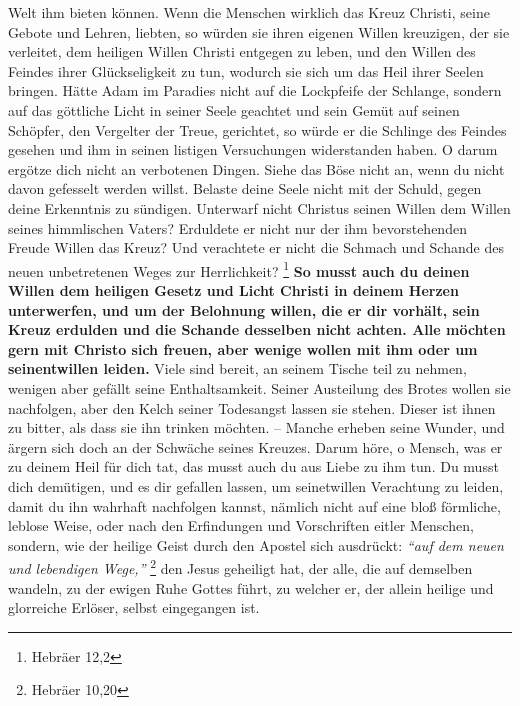 Welt ihm bieten können. Wenn die Menschen wirklich das Kreuz Christi, seine
Gebote und Lehren, liebten, so würden sie ihren eigenen Willen kreuzigen, der
sie verleitet, dem heiligen Willen Christi entgegen zu leben, und den Willen des
Feindes ihrer Glückseligkeit zu tun, wodurch sie sich um das Heil ihrer Seelen
bringen. Hätte Adam im Paradies nicht auf die Lockpfeife der Schlange, sondern
auf das göttliche Licht in seiner Seele geachtet und sein Gemüt auf seinen
Schöpfer, den Vergelter der Treue, gerichtet, so würde er die Schlinge des
Feindes gesehen und ihm in seinen listigen Versuchungen widerstanden haben. O
darum ergötze dich nicht an verbotenen Dingen. Siehe das Böse nicht an, wenn du
nicht davon gefesselt werden willst. Belaste deine Seele nicht mit der Schuld,
gegen deine Erkenntnis zu sündigen. Unterwarf nicht Christus seinen Willen dem
Willen seines himmlischen Vaters? Erduldete er nicht nur der ihm bevorstehenden
Freude Willen das Kreuz? Und verachtete er nicht die Schmach und Schande des
neuen unbetretenen Weges zur Herrlichkeit?
\footnote{Hebräer 12,2}
\label{ref:12_11_opfer} \textbf{So musst auch du
deinen Willen dem heiligen Gesetz und Licht Christi in deinem Herzen
unterwerfen, und um der Belohnung willen, die er dir vorhält, sein Kreuz
erdulden und die Schande desselben nicht achten. Alle möchten gern mit Christo
sich freuen, aber wenige wollen mit ihm oder um seinentwillen leiden.} Viele
sind
bereit, an seinem Tische teil zu nehmen, wenigen aber gefällt seine
Enthaltsamkeit. Seiner Austeilung des Brotes wollen sie nachfolgen, aber den
Kelch seiner Todesangst lassen sie stehen. Dieser ist ihnen zu bitter, als dass
sie ihn trinken möchten. -- Manche erheben seine Wunder, und ärgern sich doch an
der Schwäche seines Kreuzes. Darum höre, o Mensch, was er zu deinem Heil für
dich tat, das musst auch du aus Liebe zu ihm tun. Du musst dich demütigen, und
es dir gefallen lassen, um seinetwillen Verachtung zu leiden, damit du ihn
wahrhaft nachfolgen kannst, nämlich nicht auf eine bloß förmliche, leblose
Weise, oder nach den Erfindungen und Vorschriften eitler Menschen, sondern, wie
der heilige Geist durch den Apostel sich ausdrückt:
\textit{"`auf dem neuen und
lebendigen Wege,"'}
\footnote{Hebräer 10,20}
den Jesus geheiligt hat, der alle, die
auf demselben wandeln, zu der ewigen Ruhe Gottes führt, zu welcher er, der
allein heilige und glorreiche Erlöser, selbst eingegangen ist.



